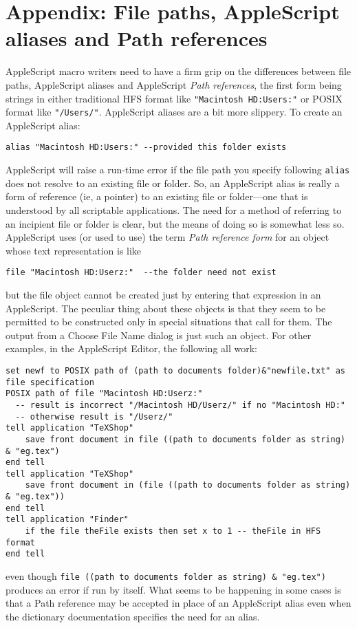 \documentclass[11pt]{amsart}
\begin{document}
\section{Appendix: File paths, AppleScript aliases and Path references}
AppleScript macro writers need to have a firm grip on the differences between file paths, AppleScript aliases and AppleScript \emph{Path references}, the first form being strings in either traditional HFS format like \verb|"Macintosh HD:Users:"| or POSIX format like \verb|"/Users/"|. AppleScript aliases are a bit more slippery. To create an AppleScript alias:
\begin{verbatim}
alias "Macintosh HD:Users:" --provided this folder exists
\end{verbatim}
AppleScript will raise a run-time error if the file path you specify following {\tt alias} does not resolve to an existing file or folder. So, an AppleScript alias is really a form of reference (ie, a pointer) to an existing file or folder---one that is understood by all scriptable applications. The need for a method of referring to  an incipient file or folder is clear, but the means of doing so is somewhat less so. AppleScript uses (or used to use) the term \emph{Path reference form} for an object whose text representation is like
\begin{verbatim}
file "Macintosh HD:Userz:"  --the folder need not exist
\end{verbatim}
but the file object  cannot be created just by entering that expression in an AppleScript.  The peculiar thing about these objects is that they seem to be permitted to be constructed only in special situations that call for them. The output from a Choose File Name dialog is just such an object. For other examples, in the AppleScript Editor, the following all work:
\begin{verbatim}
set newf to POSIX path of (path to documents folder)&"newfile.txt" as file specification
POSIX path of file "Macintosh HD:Userz:" 
  -- result is incorrect "/Macintosh HD/Userz/" if no "Macintosh HD:"
  -- otherwise result is "/Userz/"
tell application "TeXShop"
    save front document in file ((path to documents folder as string) & "eg.tex")
end tell
tell application "TeXShop"
    save front document in (file ((path to documents folder as string) & "eg.tex"))
end tell
tell application "Finder"
    if the file theFile exists then set x to 1 -- theFile in HFS format
end tell
\end{verbatim}
even though \verb|file ((path to documents folder as string) & "eg.tex")| produces an error if run by itself. What seems to be happening in some cases is that a Path reference may be accepted in place of an AppleScript alias even when the dictionary documentation specifies the need for an alias.
\end{document}
